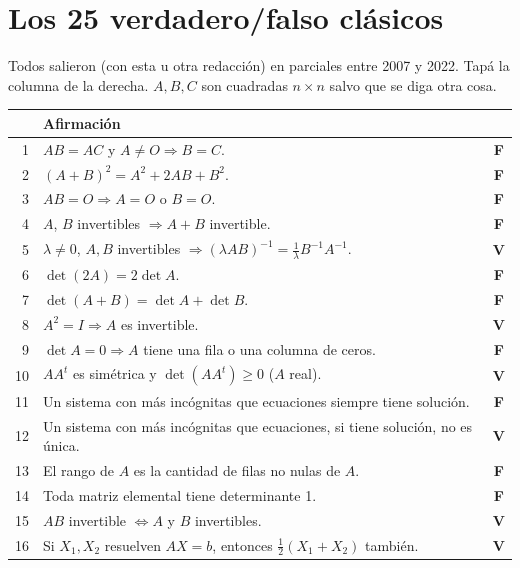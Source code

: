 \appendix
\chapter{Los 25 verdadero/falso clásicos}
Todos salieron (con esta u otra redacción) en parciales entre 2007 y 2022. Tapá la columna de la derecha. $A,B,C$ son cuadradas $n\times n$ salvo que se diga otra cosa.

{\small
\renewcommand{\arraystretch}{1.3}
\begin{tabularx}{\linewidth}{@{}r X c@{}}
\toprule
& \textbf{Afirmación} & \\
\midrule
1 & $AB=AC$ y $A\neq O\Rightarrow B=C$. & \textcolor{rojo}{\textbf{F}}\\
2 & $(A+B)^2=A^2+2AB+B^2$. & \textcolor{rojo}{\textbf{F}}\\
3 & $AB=O\Rightarrow A=O$ o $B=O$. & \textcolor{rojo}{\textbf{F}}\\
4 & $A$, $B$ invertibles $\Rightarrow A+B$ invertible. & \textcolor{rojo}{\textbf{F}}\\
5 & $\lambda\neq0$, $A,B$ invertibles $\Rightarrow(\lambda AB)^{-1}=\frac1\lambda B^{-1}A^{-1}$. & \textcolor{verde}{\textbf{V}}\\
6 & $\det(2A)=2\det A$. & \textcolor{rojo}{\textbf{F}}\\
7 & $\det(A+B)=\det A+\det B$. & \textcolor{rojo}{\textbf{F}}\\
8 & $A^2=I\Rightarrow A$ es invertible. & \textcolor{verde}{\textbf{V}}\\
9 & $\det A=0\Rightarrow A$ tiene una fila o una columna de ceros. & \textcolor{rojo}{\textbf{F}}\\
10 & $AA^t$ es simétrica y $\det(AA^t)\ge0$ ($A$ real). & \textcolor{verde}{\textbf{V}}\\
11 & Un sistema con más incógnitas que ecuaciones siempre tiene solución. & \textcolor{rojo}{\textbf{F}}\\
12 & Un sistema con más incógnitas que ecuaciones, si tiene solución, no es única. & \textcolor{verde}{\textbf{V}}\\
13 & El rango de $A$ es la cantidad de filas no nulas de $A$. & \textcolor{rojo}{\textbf{F}}\\
14 & Toda matriz elemental tiene determinante 1. & \textcolor{rojo}{\textbf{F}}\\
15 & $AB$ invertible $\iff A$ y $B$ invertibles. & \textcolor{verde}{\textbf{V}}\\
16 & Si $X_1,X_2$ resuelven $AX=b$, entonces $\frac12(X_1+X_2)$ también. & \textcolor{verde}{\textbf{V}}\\

\end{tabularx}}

